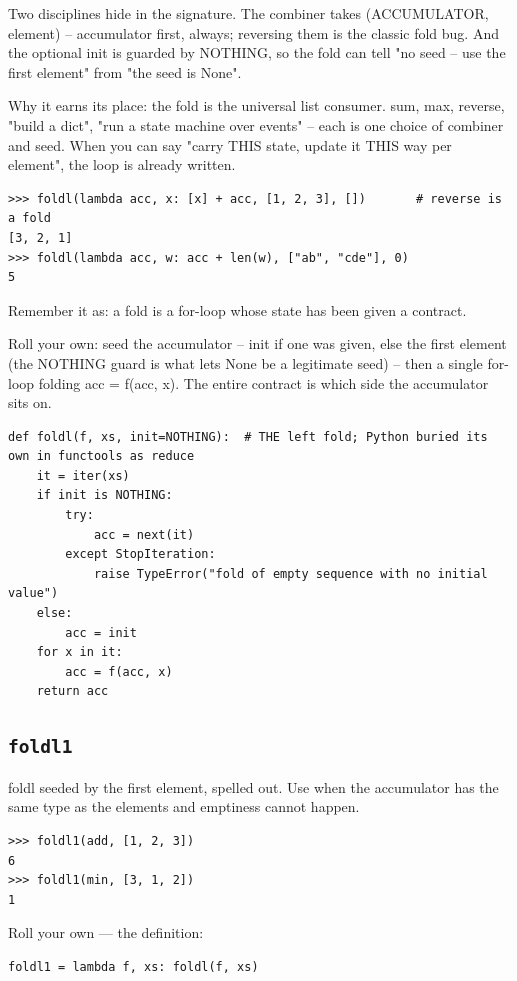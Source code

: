 \documentclass[10pt,letterpaper]{book}
\begin{document}
Two disciplines hide in the signature. The combiner takes (ACCUMULATOR, element) -- accumulator first, always; reversing them is the classic fold bug. And the optional init is guarded by NOTHING, so the fold can tell "no seed -- use the first element" from "the seed is None".


Why it earns its place: the fold is the universal list consumer. sum, max, reverse, "build a dict", "run a state machine over events" -- each is one choice of combiner and seed. When you can say "carry THIS state, update it THIS way per element", the loop is already written.

\begin{lstlisting}[style=ex]
>>> foldl(lambda acc, x: [x] + acc, [1, 2, 3], [])       # reverse is a fold
[3, 2, 1]
>>> foldl(lambda acc, w: acc + len(w), ["ab", "cde"], 0)
5
\end{lstlisting}

Remember it as: a fold is a for-loop whose state has been given a contract.


Roll your own: seed the accumulator -- init if one was given, else the first element (the NOTHING guard is what lets None be a legitimate seed) -- then a single for-loop folding acc = f(acc, x). The entire contract is which side the accumulator sits on.

\begin{lstlisting}[style=ex]
def foldl(f, xs, init=NOTHING):  # THE left fold; Python buried its own in functools as reduce
    it = iter(xs)
    if init is NOTHING:
        try:
            acc = next(it)
        except StopIteration:
            raise TypeError("fold of empty sequence with no initial value")
    else:
        acc = init
    for x in it:
        acc = f(acc, x)
    return acc
\end{lstlisting}
\subsection{\texttt{foldl1}}\label{def:foldl1}
foldl seeded by the first element, spelled out. Use when the accumulator has the same type as the elements and emptiness cannot happen.
\begin{lstlisting}[style=ex]
>>> foldl1(add, [1, 2, 3])
6
>>> foldl1(min, [3, 1, 2])
1
\end{lstlisting}

Roll your own --- the definition:

\begin{lstlisting}[style=ex]
foldl1 = lambda f, xs: foldl(f, xs)
\end{lstlisting}
\end{document}
